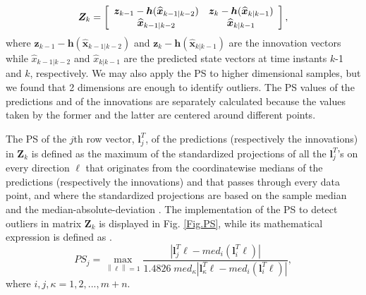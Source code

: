 \documentclass[10pt]{IEEEtran}
\begin{document}
\vspace{-0.2cm}
\begin{equation}
\boldsymbol{Z}_k=
\left[ {\begin{array}{*{20}{c cc}}
\boldsymbol{z}_{k-1} - \boldsymbol{h}(\boldsymbol{\widehat{x}}_{k-1|k-2})   & \boldsymbol{z}_{k} - \boldsymbol{h}(\boldsymbol{\widehat{x}}_{k|k-1})\\
\boldsymbol{\widehat{x}}_{k-1|k-2}                                          & \boldsymbol{\widehat{x}}_{k|k-1}
\end{array}}
\right],
\label{Z_matrix}
\end{equation}
where $\boldsymbol{z}_{k-1} - \boldsymbol{h}(\boldsymbol{\widehat{x}}_{k-1|k-2})$ and $\boldsymbol{z}_{k} - \boldsymbol{h}(\boldsymbol{\widehat{x}}_{k|k-1})$ are the innovation vectors while $\widehat{x}_{k-1|k-2}$ and $\widehat{x}_{k|k-1}$ are the predicted state vectors at time instants $k$-1 and $k$, respectively. We may also apply the PS to higher dimensional samples, but we found that 2 dimensions are enough to identify outliers. The PS values of the predictions and of the innovations are separately calculated because the values taken by the former and the latter are centered around different points.

The PS of the $j$th row vector, $\bm{l}_{j}^T$, of the predictions (respectively the innovations) in $\bm{Z}_k$ is defined as the maximum of the standardized projections of all the $\bm{l}_{j}^T$'s on every direction $\bm{\ell}$ that originates from the coordinatewise medians of the predictions (respectively the innovations) and that passes through every data point, and where the standardized projections are based on the sample median and the median-absolute-deviation \cite{Lmili1996}. The implementation of the PS to detect outliers in matrix $\bm{Z}_k$ is displayed in Fig. \ref{Fig.PS}, while its mathematical expression is defined as \cite{Lmili1996}.
\vspace{-0.2cm}
\begin{equation}
P{S_j} = {\max _{\left\| \bm{\ell} \right\| = 1}}\frac{{\left| {\bm{l}_j^T\bm{\ell} - me{d_i}\left( {\bm{l}_i^T\bm{\ell} } \right)} \right|}}{{1.4826\;me{d_\kappa}\left| {\bm{l}_\kappa^T\bm{\ell}  - me{d_i}\left( {\bm{l}_i^T\bm{\ell}} \right)} \right|}},
\label{Eq:PS}
\end{equation}
where $i,j,\kappa=1,2,...,m+n$.
\end{document}
